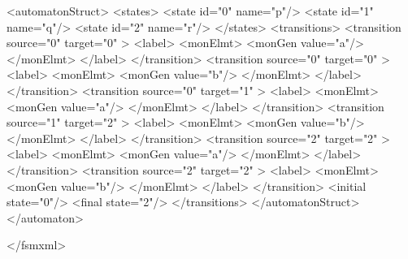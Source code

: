 {\footnotesize 
\begin{listingcont}
  <automatonStruct>
    <states>
      <state  id="0"  name="p"/>
      <state  id="1"  name="q"/>
      <state  id="2"  name="r"/>
    </states>
    <transitions>
      <transition  source="0"  target="0" >
        <label>
          <monElmt>
            <monGen value="a"/>
          </monElmt>
        </label>
      </transition>
      <transition  source="0"  target="0" >
        <label>
          <monElmt>
            <monGen value="b"/>
          </monElmt>
        </label>
      </transition>
      <transition  source="0"  target="1" >
        <label>
          <monElmt>
            <monGen value="a"/>
          </monElmt>
        </label>
      </transition>
      <transition  source="1"  target="2" >
        <label>
          <monElmt>
            <monGen value="b"/>
          </monElmt>
        </label>
      </transition>
      <transition  source="2"  target="2" >
        <label>
          <monElmt>
            <monGen value="a"/>
          </monElmt>
        </label>
      </transition>
      <transition  source="2"  target="2" >
        <label>
          <monElmt>
            <monGen value="b"/>
          </monElmt>
        </label>
      </transition>
      <initial  state="0"/>
      <final    state="2"/>
    </transitions>
  </automatonStruct>
</automaton>

</fsmxml>
\end{listingcont}
}

\clearpage
